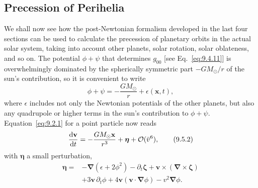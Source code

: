 
\subsection{Precession of Perihelia}\label{sec:9.5}

We shall now see how the post-Newtonian formalism developed in the last four
sections can be used to calculate the precession of planetary orbits in the
actual solar system, taking into account other planets, solar rotation, solar
oblateness, and so on. The potential \(\phi+\psi\) that determines \(g_{00}\)
[see Eq.~\eqref{eq:9.4.11}] is overwhelmingly dominated by the spherically
symmetric part \(-GM_\odot/r\) of the sun's contribution, so it is
convenient to write
\begin{equation}
  \phi+\psi=-\frac{GM_\odot}{r}+\epsilon(\mathbf x,t),
  \tag{9.5.1}\label{eq:9.5.1}
\end{equation}
where \(\epsilon\) includes not only the Newtonian potentials of the other
planets, but also any quadrupole or higher terms in the sun's contribution
to \(\phi+\psi\). Equation~\eqref{eq:9.2.1} for a point particle now reads
\begin{equation}
  \frac{\mathop{}\!\mathrm{d}\mathbf v}{\mathop{}\!\mathrm{d} t}
  =
  -\frac{GM_\odot\mathbf x}{r^3}
  +\boldsymbol\eta+\mathcal{O}(\bar v^6),
  \tag{9.5.2}\label{eq:9.5.2}
\end{equation}
with \(\boldsymbol\eta\) a small perturbation,
\begin{equation}
  \begin{split}
  \boldsymbol\eta={}&
  -\boldsymbol\nabla(\epsilon+2\phi^2)
  -\partial_t\boldsymbol\zeta
  +\mathbf v\times(\boldsymbol\nabla\times\boldsymbol\zeta)\\
  &+3\mathbf v\,\partial_t\phi
  +4\mathbf v(\mathbf v\cdot\boldsymbol\nabla\phi)
  -v^2\boldsymbol\nabla\phi.
  \end{split}
  \tag{9.5.3}\label{eq:9.5.3}
\end{equation}

